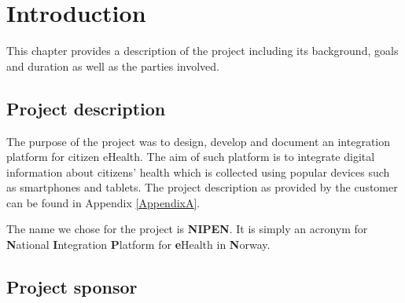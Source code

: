 
\chapter{Introduction} 
\label{Introduction} 


This chapter provides a description of the project including its background, goals and duration as well as the parties involved.

\section{Project description}
\label{section:description}

The purpose of the project was to design, develop and document an integration platform for citizen eHealth\cite{ehealth}. 
The aim of such platform is to integrate digital information about citizens' health which is collected using popular
devices such as smartphones and tablets.
The project description as provided by the customer can be found in Appendix \ref{AppendixA}.



The name we chose for the project is \textbf{NIPEN}.\newline
It is simply an acronym for \textbf{N}ational \textbf{I}ntegration \textbf{P}latform for \textbf{e}Health in \textbf{N}orway.

\section{Project sponsor}
\label{section:client}

